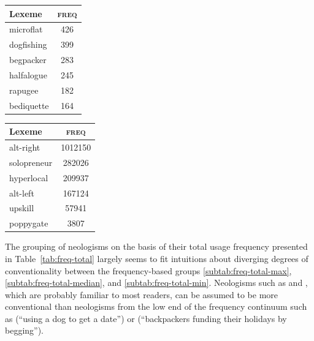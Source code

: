 \documentclass[
  a4paper,
  abstract=on,
  captions=tableabove
  ]{scrartcl}
\begin{document}
\begin{table}
        \begin{subtable}{.4\linewidth}
          \label{subtab:freq-total-min}
          \centering
          \begin{tabular}{l S[table-format=3]}
            \toprule
            Lexeme     & {\textsc{freq}} \\
            \midrule
            microflat  & 426             \\
            dogfishing & 399             \\
            begpacker  & 283             \\
            halfalogue & 245             \\
            rapugee    & 182             \\
            bediquette & 164             \\
            \bottomrule
          \end{tabular}
        \end{subtable}
        \begin{subtable}{.4\linewidth}
          \label{subtab:freq-total-cases}
          \centering
          \begin{tabular}{l S[table-format=7]}
            \toprule
            Lexeme       & {\textsc{freq}}  \\
            \midrule
            alt-right    & 1012150 \\
            solopreneur  & 282026  \\
            hyperlocal   & 209937  \\
            alt-left     & 167124  \\
            upskill      & 57941   \\
            poppygate    & 3807    \\
            \bottomrule
          \end{tabular}
        \end{subtable}
      \end{table}

      The grouping of neologisms on the basis of their total usage frequency presented in Table~\ref{tab:freq-total} largely seems to fit intuitions about diverging degrees of conventionality between the frequency-based groups \ref{subtab:freq-total-max}, \ref{subtab:freq-total-median}, and \ref{subtab:freq-total-min}. Neologisms such as  and , which are probably familiar to most readers, can be assumed to be more conventional than neologisms from the low end of the frequency continuum such as  (\enquote{using a dog to get a date}) or  (\enquote{backpackers funding their holidays by begging}).
\end{document}
